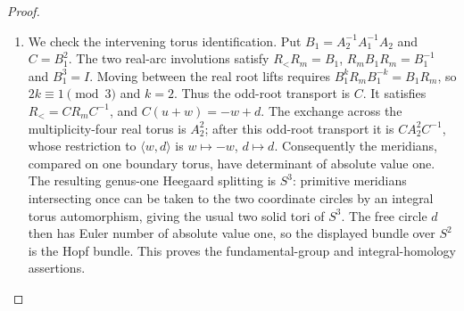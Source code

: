 \begin{proof}
\begin{enumerate}[label=\arabic*.,leftmargin=*]
\item We check the intervening torus identification. Put
$B_1=A_2^{-1}A_1^{-1}A_2$ and $C=B_1^2$. The two real-arc involutions
satisfy $R_<R_m=B_1$, $R_mB_1R_m=B_1^{-1}$ and $B_1^3=I$.
Moving between the real root lifts requires
$B_1^kR_mB_1^{-k}=B_1R_m$, so $2k\equiv1\pmod3$ and $k=2$.
Thus the odd-root transport is $C$. It satisfies $R_<=CR_mC^{-1}$, and
$C(u+w)=-w+d$. The exchange across the multiplicity-four real torus
is $A_2^2$; after this odd-root transport it is
$CA_2^2C^{-1}$, whose restriction to $\langle w,d\rangle$ is
$w\mapsto-w$, $d\mapsto d$. Consequently the meridians, compared on
one boundary torus, have determinant of absolute value one. The
resulting genus-one Heegaard splitting is $S^3$: primitive meridians
intersecting once can be taken to the two coordinate circles by an
integral torus automorphism, giving the usual two solid tori of $S^3$.
The free circle $d$ then has Euler number of absolute value one, so
the displayed bundle over $S^2$ is the Hopf bundle. This proves the
fundamental-group and integral-homology assertions.
\end{enumerate}
\end{proof}

